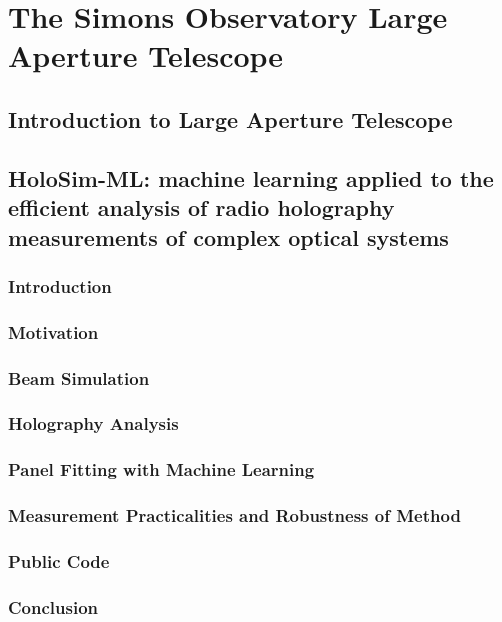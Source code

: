 \chapter{The Simons Observatory Large Aperture Telescope}

\section{Introduction to Large Aperture Telescope}
\section{HoloSim-ML: machine learning applied to the efficient analysis of radio holography measurements of complex optical systems}
\subsection{Introduction}
\subsection{Motivation}
\subsection{Beam Simulation}
\subsection{Holography Analysis}
\subsection{Panel Fitting with Machine Learning}
\subsection{Measurement Practicalities and Robustness of Method}
\subsection{Public Code}
\subsection{Conclusion}